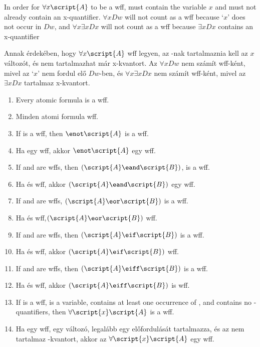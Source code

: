 In order for $\forall x\script{A}$ to be a wff,  must contain the variable $x$ and must not already contain an x-quantifier. $\forall x Dw$ will not count as a wff because `$x$' does not occur in $Dw$, and $\forall x \exists x Dx$ will not count as a wff because $\exists x Dx$ contains an x-quantifier

Annak érdekében, hogy $\forall x\script{A}$ wff legyen, az -nak tartalmaznia kell az $x$ változót, és nem tartalmazhat már x-kvantort. Az $\forall x Dw$ nem számít wff-ként, mivel az `$x$' nem fordul elő $Dw$-ben, és $\forall x \exists x Dx$ nem számít wff-ként, mivel az $\exists x Dx$ tartalmaz x-kvantort.

\begin{enumerate}
\item Every atomic formula is a wff.
\item Minden atomi formula wff.

\item If  is a wff, then $\enot\script{A}$ is a wff.
\item Ha  egy wff, akkor $\enot\script{A}$ egy wff.

\item If  and  are wffs, then $(\script{A}\eand\script{B})$, is a wff.
\item  Ha  és  wff, akkor $(\script{A}\eand\script{B})$ egy wff.

\item If  and  are wffs, $(\script{A}\eor\script{B})$ is a wff.
\item Ha  és  wff,$(\script{A}\eor\script{B})$ wff.

\item If  and  are wffs, then $(\script{A}\eif\script{B})$ is a wff.
\item Ha  és   wff, akkor $(\script{A}\eif\script{B})$ wff.

\item If  and  are wffs, then $(\script{A}\eiff\script{B})$ is a wff.
\item Ha  és  wff, akkor $(\script{A}\eiff\script{B})$ is wff.

\item If  is a wff,  is a variable,  contains at least one occurrence of , and  contains no -quantifiers, then $\forall\script{x}\script{A}$ is a wff.
\item Ha  egy wff,  egy változó,  legalább egy  előfordulását tartalmazza, és az  nem tartalmaz -kvantort, akkor az $\forall\script{x}\script{A}$ egy wff.


\end{enumerate}
